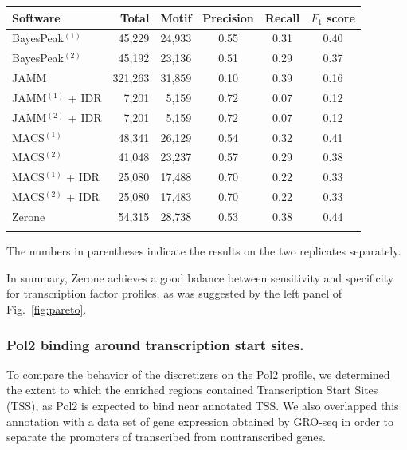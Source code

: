 \documentclass{bioinfo}
\begin{document}
\begin{table}[!b]
{\begin{tabular}{lrrccc}
        \toprule
        \textbf{Software}  & \textbf{Total}  & \textbf{Motif} &
        \textbf{Precision} & \textbf{Recall} & \textbf{$F_{1}$ score} \\
        \midrule
        BayesPeak$^{(1)}$  &  45,229 & 24,933 & 0.55 & 0.31 & 0.40 \\
        BayesPeak$^{(2)}$  &  45,192 & 23,136 & 0.51 & 0.29 & 0.37 \\
        JAMM               & 321,263 & 31,859 & 0.10 & 0.39 & 0.16 \\
        JAMM$^{(1)}$ + IDR &   7,201 &  5,159 & 0.72 & 0.07 & 0.12 \\
        JAMM$^{(2)}$ + IDR &   7,201 &  5,159 & 0.72 & 0.07 & 0.12 \\
        MACS$^{(1)}$       &  48,341 & 26,129 & 0.54 & 0.32 & 0.41 \\
        MACS$^{(2)}$       &  41,048 & 23,237 & 0.57 & 0.29 & 0.38 \\
        MACS$^{(1)}$ + IDR &  25,080 & 17,488 & 0.70 & 0.22 & 0.33 \\
        MACS$^{(2)}$ + IDR &  25,080 & 17,483 & 0.70 & 0.22 & 0.33 \\
        Zerone             &  54,315 & 28,738 & 0.53 & 0.38 & 0.44 \\
        \botrule
\end{tabular}}{The numbers in parentheses indicate the results on the two
replicates separately.}
\end{table}

In summary, Zerone achieves a good balance between sensitivity and
specificity for transcription factor profiles, as was suggested by
the left panel of Fig.~\ref{fig:pareto}.

\subsubsection{Pol2 binding around transcription start sites.}
\label{subsub:pol2}
To compare the behavior of the discretizers on the Pol2 profile,
we determined the extent to which the enriched regions contained
Transcription Start Sites (TSS), as Pol2 is expected to bind near
annotated TSS. We also overlapped this annotation with a data set of
gene expression obtained by GRO-seq in order to separate the
promoters of transcribed from nontranscribed genes.
\end{document}
